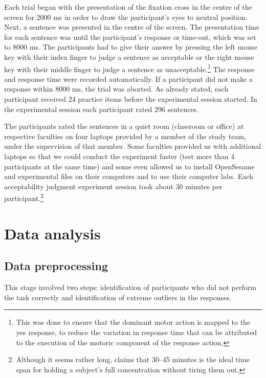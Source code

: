 Each trial began with the presentation of the fixation cross in the centre of the screen for 2000 ms in order to draw the participant’s eyes to neutral position. Next, a sentence was presented in the centre of the screen. The presentation time for each sentence was until the participant’s response or time-out, which was set to 8000 ms. The participants had to give their answer by pressing the left mouse key with their index finger to judge a sentence as acceptable or the right mouse key with their middle finger to judge a sentence as unacceptable.\footnote{This was done to ensure that the dominant motor action is mapped to the yes response, to reduce the variation in response time that can be attributed to the execution of the motoric component of the response action.} The response and response time were recorded automatically. If a participant did not make a response within 8000 ms, the trial was aborted. As already stated, each participant received 24 practice items before the experimental session started. In the experimental session each participant rated 296 sentences.

The participants rated the sentences in a quiet room (classroom or office) at respective faculties on four laptops provided by a member of the study team, under the supervision of that member. Some faculties provided us with additional laptops so that we could conduct the experiment faster (test more than 4 participants at the same time) and some even allowed us to install OpenSesame and experimental files on their computers and to use their computer labs. Each acceptability judgment experiment session took about 30 minutes per participant.\footnote{Although it seems rather long, \citet[][283]{Rosenbach13} claims that 30--45 minutes is the ideal time span for holding a subject’s full concentration without tiring them out.}

\section{Data analysis}
\label{Data analysis}
\subsection{Data preprocessing}
\label{Data preprocessing}
This stage involved two steps: identification of participants who did not perform the task correctly and identification of extreme outliers in the responses. %

